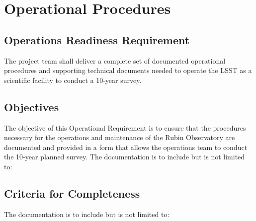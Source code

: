 \section{Operational Procedures} \label{sec:docs}

\subsection{Operations Readiness Requirement}

The project team shall deliver a complete set of documented operational procedures and supporting technical documents needed to operate the LSST as a scientific facility to conduct a 10-year survey.

\subsection{Objectives}

The objective of this Operational Requirement is to ensure that the procedures necessary for the operations and maintenance of the Rubin Observatory are documented and provided in a form that allows the operations team to conduct the 10-year planned survey. The documentation is to include but is not limited to:


\subsection{Criteria for Completeness}

The documentation is to include but is not limited to:

